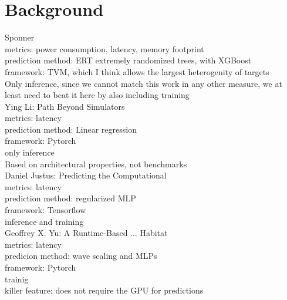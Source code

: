\chapter{Background}\label{chap:background}

Sponner \\
metrics: power consumption, latency, memory footprint \\
prediction method: ERT extremely randomized trees, with XGBoost \\
framework: TVM, which I think allows the largest heterogenity of targets \\
Only inference, since we cannot match this work in any other measure, we at least need to beat it here by also including training\\


Ying Li: Path Beyond Simulators \\
metrics: latency\\
prediction method: Linear regression\\
framework: Pytorch\\
only inference\\
Based on architectural properties, not benchmarks\\


Daniel Justus: Predicting the Computational \\
metrics: latency\\
prediction method: regularized MLP\\
framework: Tensorflow\\
inference and training \\


Geoffrey X. Yu: A Runtime-Based ... Habitat \\
metrics: latency\\
predicion method: wave scaling and MLPs\\
framework: Pytorch\\
trainig\\
killer feature: does not require the GPU for predictions\\


